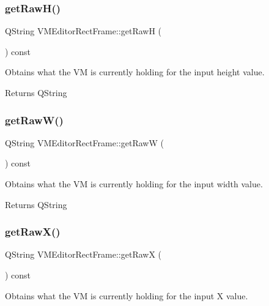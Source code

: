 \subsubsection{\texorpdfstring{getRawH()}{getRawH()}}
{\footnotesize\ttfamily Q\+String V\+M\+Editor\+Rect\+Frame\+::get\+RawH (\begin{DoxyParamCaption}{ }\end{DoxyParamCaption}) const}



Obtains what the VM is currently holding for the input height value. 

\begin{DoxyReturn}{Returns}
Q\+String 
\end{DoxyReturn}
\mbox{\label{class_v_m_editor_rect_frame_afd8cd030942478a3e2072a934dc099a5}} 
\subsubsection{\texorpdfstring{getRawW()}{getRawW()}}
{\footnotesize\ttfamily Q\+String V\+M\+Editor\+Rect\+Frame\+::get\+RawW (\begin{DoxyParamCaption}{ }\end{DoxyParamCaption}) const}



Obtains what the VM is currently holding for the input width value. 

\begin{DoxyReturn}{Returns}
Q\+String 
\end{DoxyReturn}
\mbox{\label{class_v_m_editor_rect_frame_abb4f009c3158864d941b06a534627407}} 
\subsubsection{\texorpdfstring{getRawX()}{getRawX()}}
{\footnotesize\ttfamily Q\+String V\+M\+Editor\+Rect\+Frame\+::get\+RawX (\begin{DoxyParamCaption}{ }\end{DoxyParamCaption}) const}



Obtains what the VM is currently holding for the input X value. 

